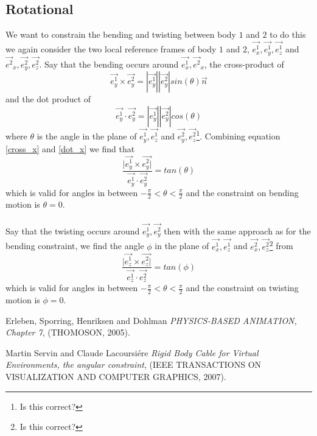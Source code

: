 \documentclass[letterpaper,12pt]{article}
\begin{document}
\subsection{Rotational}
We want to constrain the bending and twisting between body $1$ and $2$ to do this we again
consider the two local reference frames of body $1$ and $2$,
$\vec{e^1_x}, \vec{e^1_y}, \vec{e^1_z}$ and $\vec{e^2}_x, \vec{e^2_y}, \vec{e^2_z}$. Say 
that the bending occurs around $\vec{e^1_x}, \vec{e^2}_x$, the cross-product of
\begin{equation}
    \label{cross_x}
    \vec{e^1_y} \times \vec{e^2_y}=|\vec{e^1_y}| |\vec{e^2_y}| sin(\theta) \vec{n}
\end{equation}
and the dot product of
\begin{equation}
    \label{dot_x}
    \vec{e^1_y} \cdot \vec{e^2_y}=|\vec{e^1_y}| |\vec{e^2_y}| cos(\theta)
\end{equation}
where $\theta$ is the angle in the plane of $\vec{e^1_y}, \vec{e^1_z}$ and
 $\vec{e^2_y}, \vec{e^2_z}$\footnote{Is this correct?}. Combining equation \eqref{cross_x} and \eqref{dot_x}
 we find that 
 \begin{equation}
     \frac{|\vec{e^1_y} \times \vec{e^2_y|}}{\vec{e^1_y} \cdot \vec{e^2_y}}=tan(\theta)
 \end{equation}
which is valid for angles in between $-\frac{\pi}{2}< \theta < \frac{\pi}{2}$ and 
the constraint on bending motion is $\theta=0$.\\
\\
Say that the twisting occurs around $\vec{e^1_y}, \vec{e^2_y}$ then with the same approach
as for the bending constraint, we find the angle $\phi$ in the plane of $\vec{e^1_x},
 \vec{e^1_z}$ and $\vec{e^2_x}, \vec{e^2_z}$\footnote{Is this correct?} from 
\begin{equation}
    \frac{|\vec{e^1_z} \times \vec{e^2_z|}}{\vec{e^1_z} \cdot \vec{e^2_z}}=tan(\phi)
\end{equation}
which is valid for angles in between $-\frac{\pi}{2}< \theta < \frac{\pi}{2}$ and 
the constraint on twisting motion is $\phi=0$.
\begin{thebibliography}{99}

Erleben, Sporring, Henriksen and Dohlman \textit{PHYSICS-BASED ANIMATION, Chapter 7},
(THOMOSON, 2005).

Martin Servin and Claude Lacoursiére \textit{Rigid Body Cable for Virtual 
Environments, the angular constraint},
(IEEE TRANSACTIONS ON VISUALIZATION AND COMPUTER GRAPHICS, 2007).

\end{thebibliography}
\end{document}
